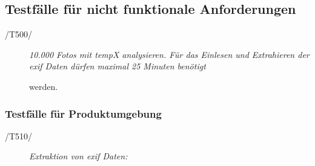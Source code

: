 \subsection{Testfälle für nicht funktionale Anforderungen}
	
	\begin{description}
		
			\item[/T500/]\textit{10.000 Fotos mit \gls{tempX} analysieren. Für das Einlesen und Extrahieren der \gls{exif} Daten dürfen maximal 25 Minuten benötigt}\par werden.
	
	\end{description}

	\subsubsection{Testfälle für Produktumgebung}

		\begin{description}

			\item[/T510/] \textit{Extraktion von \gls{exif} Daten:}\par 

		\end{description}